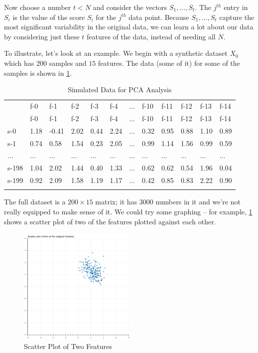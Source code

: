 \documentclass[
]{article}
\begin{document}
Now choose a number \(t<N\) and consider the vectors
\(S_{1},\ldots, S_{t}\). The \(j^{th}\) entry in \(S_{i}\) is the value
of the score \(S_{i}\) for the \(j^{th}\) data point. Because
\(S_{1},\ldots, S_{t}\) capture the most significant variability in the
original data, we can learn a lot about our data by considering just
these \(t\) features of the data, instead of needing all \(N\).

To illustrate, let's look at an example. We begin with a synthetic
dataset \(X_{0}\) which has \(200\) samples and \(15\) features. The
data (some of it) for some of the samples is shown in
\cref{tbl:rawdata}.

\begin{longtable}[]{@{}llllllllllll@{}}
\caption{Simulated Data for PCA Analysis
\label{tbl:rawdata}}\tabularnewline
\toprule
& f-0 & f-1 & f-2 & f-3 & f-4 & ... & f-10 & f-11 & f-12 & f-13 &
f-14 \\ \addlinespace
\midrule
\endfirsthead
\toprule
& f-0 & f-1 & f-2 & f-3 & f-4 & ... & f-10 & f-11 & f-12 & f-13 &
f-14 \\ \addlinespace
\midrule
\endhead
s-0 & 1.18 & -0.41 & 2.02 & 0.44 & 2.24 & ... & 0.32 & 0.95 & 0.88 &
1.10 & 0.89 \\ \addlinespace
s-1 & 0.74 & 0.58 & 1.54 & 0.23 & 2.05 & ... & 0.99 & 1.14 & 1.56 & 0.99
& 0.59 \\ \addlinespace
... & ... & ... & ... & ... & ... & ... & ... & ... & ... & ... &
... \\ \addlinespace
s-198 & 1.04 & 2.02 & 1.44 & 0.40 & 1.33 & ... & 0.62 & 0.62 & 0.54 &
1.96 & 0.04 \\ \addlinespace
s-199 & 0.92 & 2.09 & 1.58 & 1.19 & 1.17 & ... & 0.42 & 0.85 & 0.83 &
2.22 & 0.90 \\ \addlinespace
\bottomrule
\end{longtable}

The full dataset is a \(200\times 15\) matrix; it has \(3000\) numbers
in it and we're not really equipped to make sense of it. We could try
some graphing -- for example, \cref{fig:features} shows a scatter plot
of two of the features plotted against each other.

\begin{figure}
\hypertarget{fig:features}{%
\centering
\includegraphics[width=0.5\textwidth,height=\textheight]{../img/features.png}
\caption{Scatter Plot of Two Features}\label{fig:features}
}
\end{figure}
\end{document}
